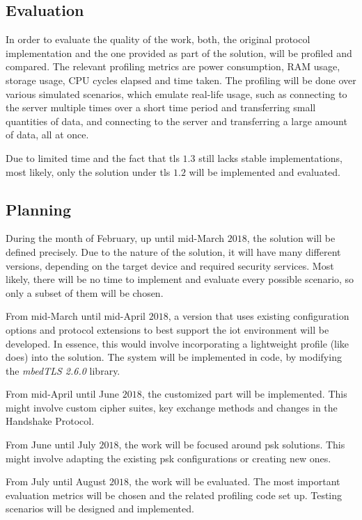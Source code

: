\documentclass{llncs}
\begin{document}
\subsection{Evaluation}

In order to evaluate the quality of the work, both, the original protocol
implementation and the one provided as part of the solution, will be profiled and compared. The relevant profiling metrics are power consumption, RAM usage, storage usage,
CPU cycles elapsed and time taken. The profiling
will be done over various simulated scenarios, which emulate real-life usage,
such as connecting to the server multiple times over a short time period and transferring
small quantities of data, and connecting to the server and transferring a large
amount of data, all at once.

Due to limited time and the fact that \gls{tls} $1.3$ still lacks stable implementations, 
most likely, only the solution under \gls{tls} $1.2$ will be implemented and evaluated.

\subsection{Planning}

During the month of February, up until mid-March $2018$, the solution will be defined precisely.
Due to the nature of the solution, it will have many different versions, depending
on the target device and required security services. Most likely, there will be no time
to implement and evaluate every possible scenario, so only a subset of them will be chosen.

From mid-March until mid-April $2018$, a version that uses existing configuration options and protocol extensions to best support the
\gls{iot} environment will be developed. In essence, this would involve incorporating a lightweight profile (like  does) into the solution. The system will be implemented in code, by modifying
the \textit{mbedTLS 2.6.0} library\cite{SSLLibra13:online}.

From mid-April until June $2018$, the customized part will be implemented.
This might involve custom cipher suites, key exchange methods and changes in
the Handshake Protocol.

From June until July $2018$, the work will be focused around \gls{psk}
solutions. This might involve adapting the existing \gls{psk} configurations
or creating new ones.

From July until August $2018$, the work will be evaluated. The most important
evaluation metrics will be chosen and the related profiling code set up. Testing
scenarios will be designed and implemented.
\end{document}
